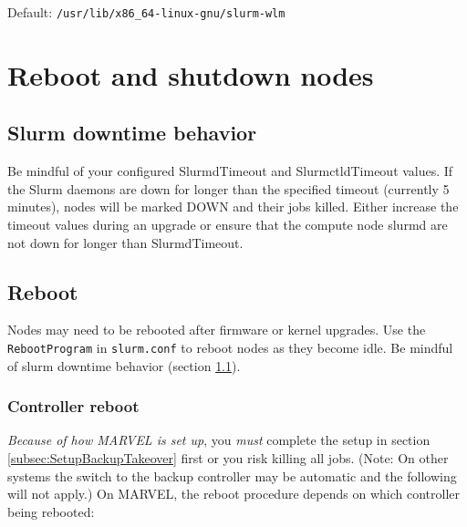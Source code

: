 Default: \texttt{/usr/lib/x86\_64-linux-gnu/slurm-wlm}

\section{Reboot and shutdown nodes} \label{sec:slurmpowercycle}

\subsection{Slurm downtime behavior} \label{subsec:slurmdowntime}
Be mindful of your configured SlurmdTimeout and SlurmctldTimeout values. If the Slurm daemons are down for longer than the specified timeout (currently 5 minutes), nodes will be marked DOWN and their jobs killed. Either increase the timeout values during an upgrade or ensure that the compute node slurmd are not down for longer than SlurmdTimeout. 

\subsection{Reboot} \label{subsec:slurmreboot}

Nodes may need to be rebooted after firmware or kernel upgrades. Use the \texttt{RebootProgram} in \texttt{slurm.conf} to reboot nodes as they become idle. Be mindful of slurm downtime behavior (section \ref{subsec:slurmdowntime}).

\subsubsection{Controller reboot} \label{subsec:rebootSlurmControl}

\emph{Because of how MARVEL is set up}, you \emph{must} complete the setup in section \ref{subsec:SetupBackupTakeover} first or you risk killing all jobs. (Note: On other systems the switch to the backup controller may be automatic and the following will not apply.) On MARVEL, the reboot procedure depends on which controller being rebooted:

